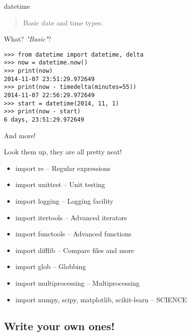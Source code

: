 \documentclass[ignorenonframetext,]{beamer}
\begin{document}
\begin{frame}[fragile]{datetime}

    \begin{quote}
    Basic date and time types.
    \end{quote}
    What? \emph{"Basic"}?

    \begin{tcolorbox}
    \begin{verbatim}
>>> from datetime import datetime, delta
>>> now = datetime.now()
>>> print(now)
2014-11-07 23:51:29.972649
>>> print(now - timedelta(minutes=55))
2014-11-07 22:56:29.972649
>>> start = datetime(2014, 11, 1)
>>> print(now - start)
6 days, 23:51:29.972649
    \end{verbatim}
    \end{tcolorbox}
\end{frame}

\begin{frame}[fragile]{And more!}

    Look them up, they are all pretty neat!

    \begin{itemize}
        \item import re -- Regular expressions
        \item import unittest -- Unit testing
        \item import logging -- Logging facility
        \item import itertools -- Advanced iterators
        \item import functools -- Advanced functions
        \item import difflib -- Compare files and more
        \item import glob -- Globbing
        \item import multiprocessing -- Multiprocessing
        \item import numpy, scipy, matplotlib, scikit-learn -- SCIENCE
    \end{itemize}
\end{frame}

\subsection{Write your own ones!}
\end{document}
